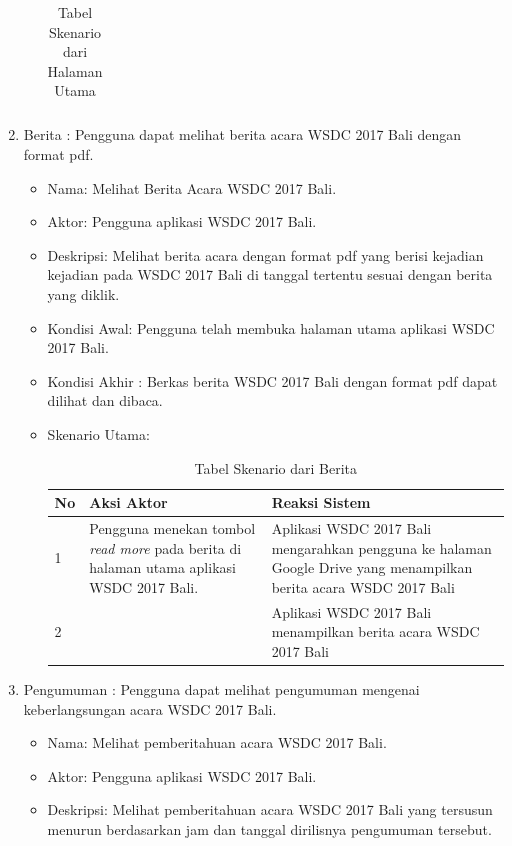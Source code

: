 \begin{enumerate}
\begin{itemize}
\begin{table}[H]
\begin{tabular}{|p{0.5cm}|p{7cm}|p{7cm}|}
			\end{tabular}
			\caption{Tabel Skenario dari Halaman Utama}
			\label{table:skenarioHalamanUtama}
		\end{table}
	\end{itemize}
	\item Berita : Pengguna dapat melihat berita acara WSDC 2017 Bali dengan format pdf.
	\begin{itemize}
		\item Nama: Melihat Berita Acara WSDC 2017 Bali.
		\item Aktor: Pengguna aplikasi WSDC 2017 Bali.
		\item Deskripsi: Melihat berita acara dengan format pdf yang berisi kejadian kejadian pada WSDC 2017 Bali di tanggal tertentu sesuai dengan berita yang diklik.
		\item Kondisi Awal: Pengguna telah membuka halaman utama aplikasi WSDC 2017 Bali.
		\item Kondisi Akhir : Berkas berita WSDC 2017 Bali dengan format pdf dapat dilihat dan dibaca.
		\item Skenario Utama: \\
		\begin{table}[H]
			\centering
			\begin{tabular}{|p{0.5cm}|p{7cm}|p{7cm}|}
				\hline
				No & Aksi Aktor                               & Reaksi Sistem                                          \\ \hline
				1  & Pengguna menekan tombol {\it read more} pada berita di halaman utama aplikasi WSDC 2017 Bali. & Aplikasi WSDC 2017 Bali mengarahkan pengguna ke halaman Google Drive yang menampilkan berita acara WSDC 2017 Bali \\ \hline
				2  &  & Aplikasi WSDC 2017 Bali menampilkan berita acara WSDC 2017 Bali \\ \hline
			\end{tabular}
			\caption{Tabel Skenario dari Berita}
			\label{table:skenarioBerita}
		\end{table}
	\end{itemize}
	\item Pengumuman : Pengguna dapat melihat pengumuman mengenai keberlangsungan acara WSDC 2017 Bali.
	\begin{itemize}
		\item Nama: Melihat pemberitahuan acara WSDC 2017 Bali.
		\item Aktor: Pengguna aplikasi WSDC 2017 Bali.
		\item Deskripsi: Melihat pemberitahuan acara WSDC 2017 Bali yang tersusun menurun berdasarkan jam dan tanggal dirilisnya pengumuman tersebut.

\end{itemize}
\end{enumerate}
